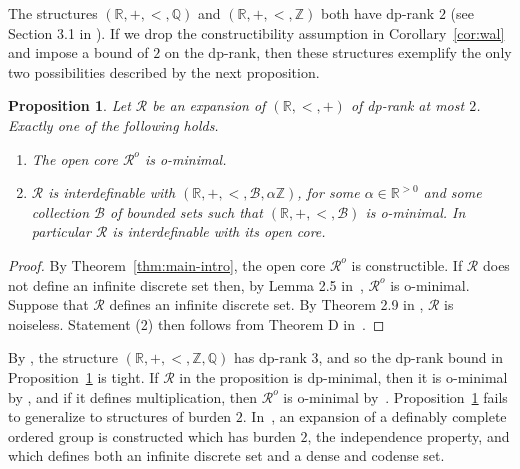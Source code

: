 \documentclass[12pt]{article}
\newcommand{\Bb}{\mathcal{B}}
\newcommand{\Mm}{\mathcal{M}}
\newcommand{\Rr}{\mathcal{R}}
\newcommand{\R}{\mathbb{R}}
\newcommand{\Z}{\mathbb{Z}}
\newcommand{\Q}{\mathbb{Q}}
\newcommand{\Ro}{\Rr^o}
\newtheorem{proposition}[theorem]{Proposition}
\theoremstyle{definition}
\theoremstyle{remark}
\begin{document}

The structures $(\R,+,<,\Q)$ and $(\R,+,<,\Z)$ both have dp-rank $2$ (see Section 3.1 in \cite{DG17}). If we drop the constructibility assumption in Corollary~\ref{cor:wal} and impose a bound of $2$ on the dp-rank, then these structures exemplify the only two possibilities described by the next proposition.  




\begin{proposition}\label{prop:dprk2}
Let $\Rr$ be an expansion of $(\R,<,+)$ of dp-rank at most $2$. Exactly one of the following holds. 
\begin{enumerate}
    \item The open core $\Ro$ is o-minimal. 
    \item $\Rr$ is interdefinable with $(\R,+,<,\Bb, \alpha\Z)$, for some $\alpha\in \R^{>0}$ and some collection $\Bb$ of bounded sets such that $(\R, +, <,\Bb)$ is o-minimal. In particular $\Rr$ is interdefinable with its open core.
\end{enumerate}
\end{proposition}
\begin{proof}
By Theorem~\ref{thm:main-intro}, the open core $\Ro$ is constructible. If $\Rr$ does not define an infinite discrete set then, by Lemma 2.5 in~\cite{DMS10}, $\Ro$ is o-minimal. 
Suppose that $\Rr$ defines an infinite discrete set. By Theorem 2.9 in \cite{DG-burden2}, $\Rr$ is noiseless. Statement (2) then follows from Theorem D in~\cite{Wal22}.
\end{proof}

By \cite[Proposition 3.1]{DG17}, the structure $(\R, +, <, \Z, \Q)$ has dp-rank $3$, and so the dp-rank bound in Proposition~\ref{prop:dprk2} is tight. If $\Rr$ in the proposition is dp-minimal, then it is o-minimal by \cite[Corollary 3.7]{simon-dp-min-order}, and if it defines multiplication, then $\Ro$ is o-minimal by~\cite[Corollary 2.4.]{DG17}. Proposition~\ref{prop:dprk2} fails to generalize to structures of burden $2$. In~\cite[Section 3]{dolich-good22}, an expansion of a definably complete ordered group is constructed which has burden $2$, the independence property, and which defines both an infinite discrete set and a dense and codense set. 
\end{document}
